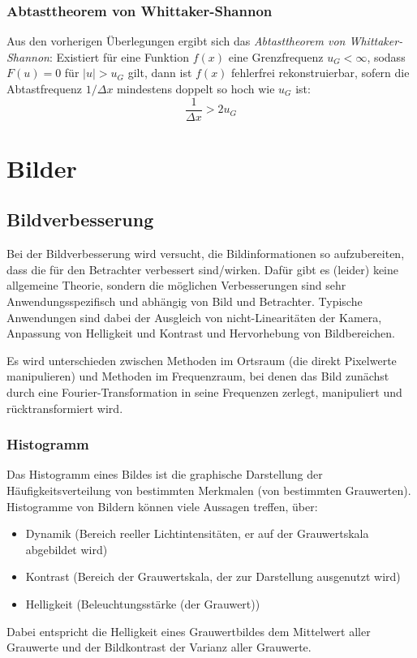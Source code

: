 		\subsection{Abtasttheorem von Whittaker-Shannon}
			Aus den vorherigen Überlegungen ergibt sich das \emph{Abtasttheorem von Whittaker-Shannon}: Existiert für eine Funktion \( f(x) \) eine Grenzfrequenz \( u_G < \infty \), sodass \( F(u) = 0 \) für \( \lvert u \rvert > u_G \) gilt, dann ist \( f(x) \) fehlerfrei rekonstruierbar, sofern die Abtastfrequenz \( 1 / \Delta x \) mindestens doppelt so hoch wie \( u_G \) ist:
			\begin{equation*}
				\frac{1}{\Delta x} > 2 u_G
			\end{equation*}

\chapter{Bilder}
	\section{Bildverbesserung}
		Bei der Bildverbesserung wird versucht, die Bildinformationen so aufzubereiten, dass die für den Betrachter verbessert sind/wirken. Dafür gibt es (leider) keine allgemeine Theorie, sondern die möglichen Verbesserungen sind sehr Anwendungsspezifisch und abhängig von Bild und Betrachter. Typische Anwendungen sind dabei der Ausgleich von nicht-Linearitäten der Kamera, Anpassung von Helligkeit und Kontrast und Hervorhebung von Bildbereichen.
		
		Es wird unterschieden zwischen Methoden im Ortsraum (die direkt Pixelwerte manipulieren) und Methoden im Frequenzraum, bei denen das Bild zunächst durch eine Fourier-Transformation in seine Frequenzen zerlegt, manipuliert und rücktransformiert wird.

		\subsection{Histogramm}
			Das Histogramm eines Bildes ist die graphische Darstellung der Häufigkeitsverteilung von bestimmten Merkmalen (\zB von bestimmten Grauwerten). Histogramme von Bildern können viele Aussagen treffen, \zB über:
			\begin{itemize}
				\item Dynamik (Bereich reeller Lichtintensitäten, er auf der Grauwertskala abgebildet wird)
				\item Kontrast (Bereich der Grauwertskala, der zur Darstellung ausgenutzt wird)
				\item Helligkeit (Beleuchtungsstärke (der Grauwert))
			\end{itemize}
			Dabei entspricht die Helligkeit eines Grauwertbildes dem Mittelwert aller Grauwerte und der Bildkontrast der Varianz aller Grauwerte.

